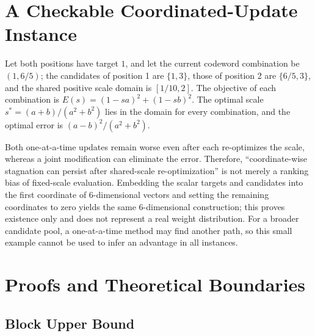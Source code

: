\section{A Checkable Coordinated-Update Instance}
\label{app:example}

Let both positions have target $1$, and let the current codeword combination be $(1,6/5)$; the candidates of position 1 are $\{1,3\}$, those of position 2 are $\{6/5,3\}$, and the shared positive scale domain is $[1/10,2]$.
The objective of each combination is $E(s)=(1-sa)^2+(1-sb)^2$.
The optimal scale $s^*=(a+b)/(a^2+b^2)$ lies in the domain for every combination, and the optimal error is $(a-b)^2/(a^2+b^2)$.



Both one-at-a-time updates remain worse even after each re-optimizes the scale, whereas a joint modification can eliminate the error.
Therefore, ``coordinate-wise stagnation can persist after shared-scale re-optimization'' is not merely a ranking bias of fixed-scale evaluation.
Embedding the scalar targets and candidates into the first coordinate of 6-dimensional vectors and setting the remaining coordinates to zero yields the same 6-dimensional construction; this proves existence only and does not represent a real weight distribution.
For a broader candidate pool, a one-at-a-time method may find another path, so this small example cannot be used to infer an advantage in all instances.

\section{Proofs and Theoretical Boundaries}
\label{app:theory}

\subsection{Block Upper Bound}


